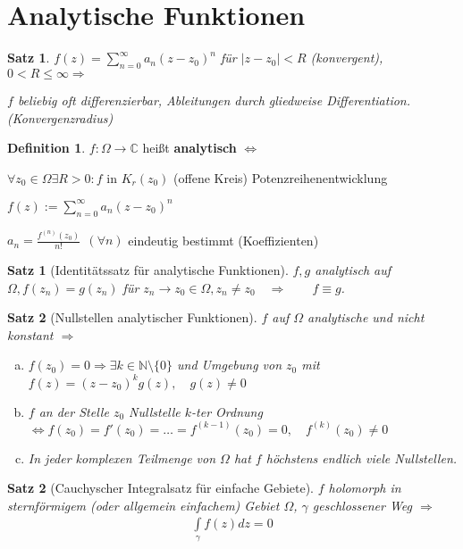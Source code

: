 \documentclass[ngerman,halfparskip]{scrartcl}
\newtheorem*{satz}{Satz}
\newtheorem*{satz*}{Satz}
\theoremstyle{definition}
\newtheorem*{defin}{Definition}
\def\C{\mathbb C}
\begin{document}
\section{Analytische Funktionen}
\begin{satz}
$f(z)=\sum\limits_{n=0}^\infty a_n(z-z_0)^n$ für $|z-z_0|<R$ (konvergent), $0<R\leq \infty \Rightarrow$

$f$ beliebig oft differenzierbar, Ableitungen durch gliedweise Differentiation.  (Konvergenzradius)
\end{satz}

\begin{defin}
$f:\Omega\rightarrow \C$ heißt \textbf{analytisch} $\Leftrightarrow$

$\forall z_0 \in\Omega \exists R > 0 : f$ in $K_r(z_0)$ (offene Kreis) Potenzreihenentwicklung

$f(z):=\sum\limits_{n=0}^\infty a_n (z-z_0)^n$
\end{defin}


$a_n=\frac{f^{(n)}(z_0)}{n!}~~(\forall n)$ eindeutig bestimmt (Koeffizienten)

\begin{satz*}[Identitätssatz für analytische Funktionen]
$f,g$ analytisch auf $\Omega, f(z_n)=g(z_n)$ für $z_n\rightarrow z_0\in\Omega, z_n\neq z_0\quad \Rightarrow
\qquad f\equiv g$.
\end{satz*}


\begin{satz}[Nullstellen analytischer Funktionen]
$f$ auf $\Omega$ analytische und nicht konstant $\Rightarrow$
\begin{enumerate}[a)]
\item $f(z_0)=0 \Rightarrow \exists k\in\mathbb N\setminus \{0\}$ und Umgebung von $z_0$ mit $f(z)=(z-z_0)^kg(z), \quad g(z)\neq 0$
\item $f$ an der Stelle $z_0$ Nullstelle $k$-ter Ordnung $\Leftrightarrow f(z_0)=f'(z_0)=\ldots=f^{(k-1)}(z_0)=0, \quad f^{(k)}(z_0)\neq 0$
\item In jeder komplexen Teilmenge von $\Omega$ hat $f$ höchstens endlich viele Nullstellen.
\end{enumerate}
\end{satz}

\begin{satz*}[Cauchyscher Integralsatz für einfache Gebiete]
$f$ holomorph in sternförmigem (oder allgemein einfachem) Gebiet $\Omega$, $\gamma$  geschlossener Weg $\Rightarrow$
\begin{gather*}\tag{$*$}
\int\limits_\gamma f(z)dz=0
\end{gather*}
\end{satz*}
\end{document}
